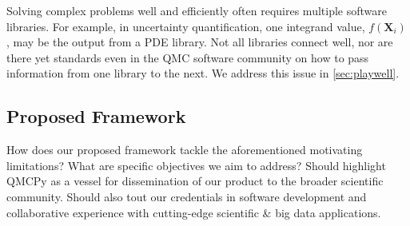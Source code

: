 \documentclass[11pt]{NSFamsart}
\newcommand{\cmtS}[1]{{\color{blue}{(Simon: #1)}}}
\newcommand{\bX}{{\boldsymbol{X}}}
\begin{document}
Solving complex problems well and efficiently often requires  multiple software libraries.  For example, in uncertainty quantification, one integrand value, $f(\bX_i)$, may be the output from a PDE  library.  Not all libraries connect well, nor are there yet standards even in the QMC software community on how to pass information from one library to the next.  We address this issue in  \cref{sec:playwell}.



\subsection{Proposed Framework} How does our proposed framework tackle the aforementioned motivating limitations? What are specific objectives we aim to address? Should highlight QMCPy as a vessel for dissemination of our product to the broader scientific community. Should also tout our credentials in software development and collaborative experience with cutting-edge scientific \& big data applications. \cmtS{add workflow figure going from applications to tasks.}

\end{document}
